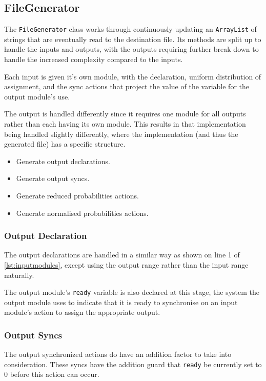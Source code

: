 \documentclass[report.tex]{subfiles}
\begin{document}
\subsection{FileGenerator} %
\label{sub:filegenerator}
The \texttt{FileGenerator} class works through continuously updating an
\texttt{ArrayList} of strings that are eventually read to the destination file.
Its methods are split up to handle the inputs and outputs, with the outputs
requiring further break down to handle the increased complexity compared to the
inputs.



Each input is given it's own module, with the declaration, uniform distribution
of assignment, and the sync actions that project the value of the variable for
the output module's use.

The output is handled differently since it requires one module for all outputs
rather than each having its own module. This results in that implementation
being handled slightly differently, where the implementation (and thus the
generated file) has a specific structure.
\begin{itemize}
    \item Generate output declarations.
    \item Generate output syncs.
    \item Generate reduced probabilities actions.
    \item Generate normalised probabilities actions.
\end{itemize}

\subsubsection{Output Declaration} %
\label{ssub:output_dec_impl}
The output declarations are handled in a similar way as shown on line  1 of
\ref{lst:inputmodules}, except using the output range rather than the input
range naturally.

The output module's \texttt{ready} variable is also declared at this stage,
the system the output module uses to indicate that it is ready to synchronise
on an input module's action to assign the appropriate output.

\subsubsection{Output Syncs} %
\label{ssub:output_syncs}
The output synchronized actions do have an addition factor to take into
consideration. These syncs have the addition guard that \texttt{ready} be
currently set to 0 before this action can occur.
\end{document}
